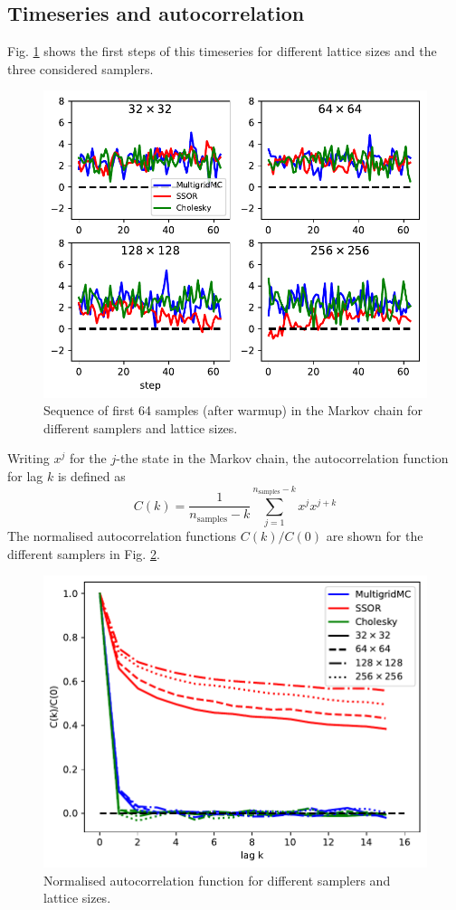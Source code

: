 \documentclass[11pt]{article}
\begin{document}
\subsection{Timeseries and autocorrelation}
Fig. \ref{fig:timeseries} shows the first steps of this timeseries for different lattice sizes and the three considered samplers.
\begin{figure}
    \begin{center}
        \includegraphics[width=0.7\linewidth]{timeseries.pdf}
        \caption{Sequence of first 64 samples (after warmup) in the Markov chain for different samplers and lattice sizes.}
        \label{fig:timeseries}
    \end{center}
\end{figure}
Writing $x^j$ for the $j$-the state in the Markov chain, the autocorrelation function for lag $k$ is defined as
\begin{equation}
    C(k) = \frac{1}{n_{\text{samples}}-k}\sum_{j=1}^{n_\text{samples}-k} x^{j} x^{j+k}
\end{equation}
The normalised autocorrelation functions $C(k)/C(0)$ are shown for the different samplers in Fig. \ref{fig:autocorrelation}.
\begin{figure}
    \begin{center}
        \includegraphics[width=0.7\linewidth]{autocorrelation.pdf}
        \caption{Normalised autocorrelation function for different samplers and lattice sizes.}
        \label{fig:autocorrelation}
    \end{center}
\end{figure}
\end{document}

